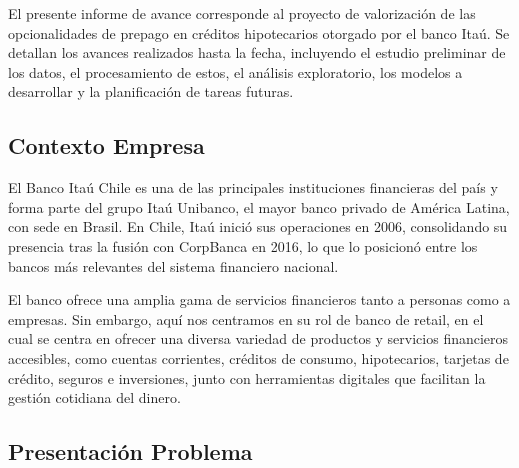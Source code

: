 \qquad El presente informe de avance corresponde al proyecto de valorización de las opcionalidades de prepago en créditos hipotecarios otorgado por el banco Itaú. Se detallan los avances realizados hasta la fecha, incluyendo el estudio preliminar de los datos, el procesamiento de estos, el análisis exploratorio, los modelos a desarrollar y la planificación de tareas futuras.

\subsection{Contexto Empresa}

\qquad El Banco Itaú Chile es una de las principales instituciones financieras del país y forma parte del grupo Itaú Unibanco, el mayor banco privado de América Latina, con sede en Brasil. En Chile, Itaú inició sus operaciones en 2006, consolidando su presencia tras la fusión con CorpBanca en 2016, lo que lo posicionó entre los bancos más relevantes del sistema financiero nacional.

\qquad El banco ofrece una amplia gama de servicios financieros tanto a personas como a empresas. Sin embargo, aquí nos centramos en su rol de banco de retail, en el cual se centra en ofrecer una diversa variedad de productos y servicios financieros accesibles, como cuentas corrientes, créditos de consumo, hipotecarios, tarjetas de crédito, seguros e inversiones, junto con herramientas digitales que facilitan la gestión cotidiana del dinero.

\subsection{Presentación Problema}